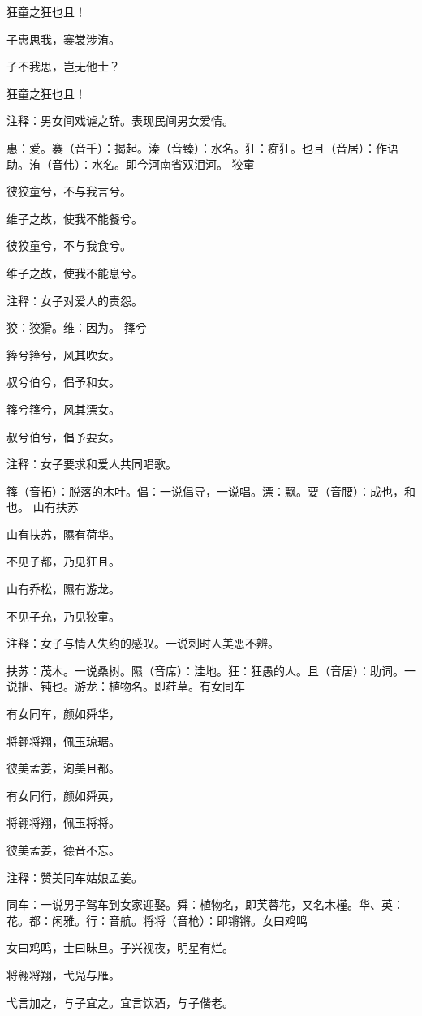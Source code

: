 \documentclass[12pt,UTF8]{ctexbook}
\begin{document}
狂童之狂也且！

子惠思我，褰裳涉洧。

子不我思，岂无他士？

狂童之狂也且！

注释：男女间戏谑之辞。表现民间男女爱情。

惠：爱。褰（音千）：揭起。溱（音臻）：水名。狂：痴狂。也且（音居）：作语助。洧（音伟）：水名。即今河南省双泪河。 狡童

彼狡童兮，不与我言兮。

维子之故，使我不能餐兮。

彼狡童兮，不与我食兮。

维子之故，使我不能息兮。

注释：女子对爱人的责怨。

狡：狡猾。维：因为。 箨兮

箨兮箨兮，风其吹女。

叔兮伯兮，倡予和女。

箨兮箨兮，风其漂女。

叔兮伯兮，倡予要女。

注释：女子要求和爱人共同唱歌。

箨（音拓）：脱落的木叶。倡：一说倡导，一说唱。漂：飘。要（音腰）：成也，和也。 山有扶苏

山有扶苏，隰有荷华。

不见子都，乃见狂且。

山有乔松，隰有游龙。

不见子充，乃见狡童。

注释：女子与情人失约的感叹。一说刺时人美恶不辨。

扶苏：茂木。一说桑树。隰（音席）：洼地。狂：狂愚的人。且（音居）：助词。一说拙、钝也。游龙：植物名。即荭草。有女同车

有女同车，颜如舜华，

将翱将翔，佩玉琼琚。

彼美孟姜，洵美且都。

有女同行，颜如舜英，

将翱将翔，佩玉将将。

彼美孟姜，德音不忘。

注释：赞美同车姑娘孟姜。

同车：一说男子驾车到女家迎娶。舜：植物名，即芙蓉花，又名木槿。华、英：花。都：闲雅。行：音航。将将（音枪）：即锵锵。女曰鸡鸣

女曰鸡鸣，士曰昧旦。子兴视夜，明星有烂。

将翱将翔，弋凫与雁。

弋言加之，与子宜之。宜言饮酒，与子偕老。
\end{document}
